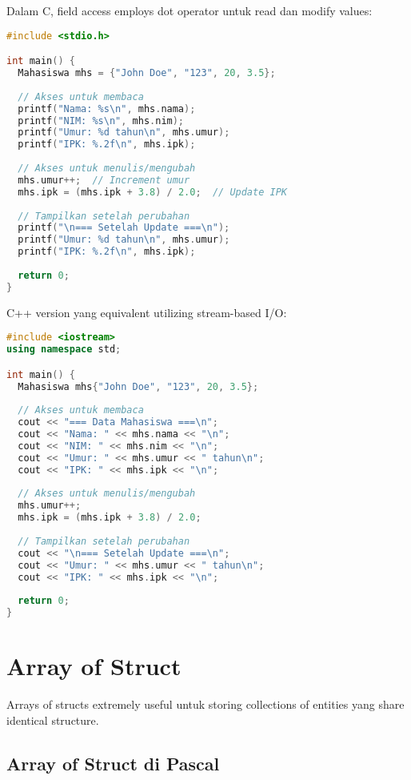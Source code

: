 \documentclass[../main.tex]{subfiles}
\begin{document}
Dalam C, field access employs dot operator untuk read dan modify values:

\begin{lstlisting}[language=C, caption={Akses field di C}]
#include <stdio.h>

int main() {
  Mahasiswa mhs = {"John Doe", "123", 20, 3.5};
  
  // Akses untuk membaca
  printf("Nama: %s\n", mhs.nama);
  printf("NIM: %s\n", mhs.nim);
  printf("Umur: %d tahun\n", mhs.umur);
  printf("IPK: %.2f\n", mhs.ipk);
  
  // Akses untuk menulis/mengubah
  mhs.umur++;  // Increment umur
  mhs.ipk = (mhs.ipk + 3.8) / 2.0;  // Update IPK
  
  // Tampilkan setelah perubahan
  printf("\n=== Setelah Update ===\n");
  printf("Umur: %d tahun\n", mhs.umur);
  printf("IPK: %.2f\n", mhs.ipk);
  
  return 0;
}
\end{lstlisting}

C++ version yang equivalent utilizing stream-based I/O:

\begin{lstlisting}[language=C++, caption={Akses field di C++}]
#include <iostream>
using namespace std;

int main() {
  Mahasiswa mhs{"John Doe", "123", 20, 3.5};
  
  // Akses untuk membaca
  cout << "=== Data Mahasiswa ===\n";
  cout << "Nama: " << mhs.nama << "\n";
  cout << "NIM: " << mhs.nim << "\n";
  cout << "Umur: " << mhs.umur << " tahun\n";
  cout << "IPK: " << mhs.ipk << "\n";
  
  // Akses untuk menulis/mengubah
  mhs.umur++;
  mhs.ipk = (mhs.ipk + 3.8) / 2.0;
  
  // Tampilkan setelah perubahan
  cout << "\n=== Setelah Update ===\n";
  cout << "Umur: " << mhs.umur << " tahun\n";
  cout << "IPK: " << mhs.ipk << "\n";
  
  return 0;
}
\end{lstlisting}

\section{Array of Struct}

Arrays of structs extremely useful untuk storing collections of entities yang share identical structure.

\subsection{Array of Struct di Pascal}
\end{document}
